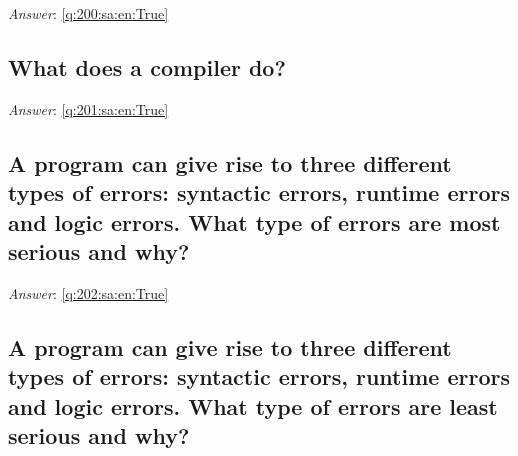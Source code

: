 \documentclass[a4paper,11pt,oneside]{article}
\begin{document}
\begin{sloppypar}
\vspace{2cm}

\noindent\makebox[\textwidth]{\hrulefill}

\vspace{1cm}

\textit{Answer}: \autoref{q:200:sa:en:True}



\subsection{What does a compiler do?}

\label{q:201:sa:en:False}

\vspace{2cm}

\noindent\makebox[\textwidth]{\hrulefill}

\vspace{1cm}

\textit{Answer}: \autoref{q:201:sa:en:True}



\subsection{A program can give rise to three different types of errors: syntactic errors, runtime errors and logic errors. What type of errors are most serious and why?}

\label{q:202:sa:en:False}

\vspace{2cm}

\noindent\makebox[\textwidth]{\hrulefill}

\vspace{1cm}

\textit{Answer}: \autoref{q:202:sa:en:True}



\subsection{A program can give rise to three different types of errors: syntactic errors, runtime errors and logic errors. What type of errors are least serious and why?}

\label{q:203:sa:en:False}

\vspace{2cm}

\noindent\makebox[\textwidth]{\hrulefill}

\vspace{1cm}


\end{sloppypar}
\end{document}
